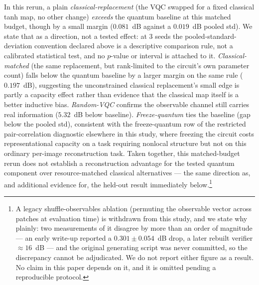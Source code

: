 \documentclass[11pt]{article}
\begin{document}
In this rerun, a plain \emph{classical-replacement} (the VQC swapped for a fixed classical tanh map, no other change) \emph{exceeds} the quantum baseline at this matched budget, though by a small margin ($0.081$~dB against a $0.019$~dB pooled std). We state that as a direction, not a tested effect: at 3 seeds the pooled-standard-deviation convention declared above is a descriptive comparison rule, not a calibrated statistical test, and no $p$-value or interval is attached to it. \emph{Classical-matched} (the same replacement, but rank-limited to the circuit's own parameter count) falls below the quantum baseline by a larger margin on the same rule ($0.197$~dB), suggesting the unconstrained classical replacement's small edge is partly a capacity effect rather than evidence that the classical map itself is a better inductive bias. \emph{Random-VQC} confirms the observable channel still carries real information ($5.32$~dB below baseline). \emph{Freeze-quantum} ties the baseline (gap below the pooled std), consistent with the freeze-quantum row of the restricted pair-correlation diagnostic elsewhere in this study, where freezing the circuit costs representational capacity on a task requiring nonlocal structure but not on this ordinary per-image reconstruction task. Taken together, this matched-budget rerun does not establish a reconstruction advantage for the tested quantum component over resource-matched classical alternatives --- the same direction as, and additional evidence for, the held-out result immediately below.\footnote{A legacy shuffle-observables ablation (permuting the observable vector across patches at evaluation time) is withdrawn from this study, and we state why plainly: two measurements of it disagree by more than an order of magnitude --- an early write-up reported a $0.301\pm0.054$~dB drop, a later rebuilt verifier $\approx16$~dB --- and the original generating script was never committed, so the discrepancy cannot be adjudicated. We do not report either figure as a result. No claim in this paper depends on it, and it is omitted pending a reproducible protocol.}
\end{document}
